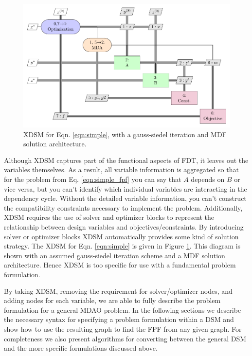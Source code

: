     \begin{figure}
        \begin{center}
        \includegraphics[height=.25\textheight]{XDSM/simple}
        \caption{XDSM for Eqn. \ref{eqn:simple}, with a gauss-siedel iteration and MDF solution architecture. \label{fig:XDSM_simple}}
        \end{center}
    \end{figure}

    Although XDSM captures part of the functional aspects of FDT, it leaves out the variables themselves. 
    As a result, all variable information is aggregated 
    so that for the problem from Eq. \ref{eqn:simple_fpf} you can say that $A$ depends on $B$ or vice versa, but you can't identify which 
    individual variables are interacting in the dependency cycle. Without the detailed variable information, you can't construct the compatibility 
    constraints necessary to implement the problem. Additionally, XDSM requires the use of solver and optimizer blocks to represent 
    the relationship between design variables and objectives/constraints. By introducing solver or optimizer blocks XDSM automatically provides
    some kind of solution strategy. The XDSM for Eqn. \ref{eqn:simple} is given in Figure \ref{fig:XDSM_simple}. 
    This diagram is shown with an assumed gauss-siedel iteration scheme and a MDF solution architecture. 
    Hence XDSM is too specific for use with a fundamental problem formulation. 

    By taking XDSM, removing the requirement for solver/optimizer nodes, and adding nodes for each variable, we are able to fully describe 
    the problem formulation for a general MDAO problem. In the following sections we describe the necessary syntax for specifying a 
    problem formulation within a DSM and show how to use the resulting graph to find the FPF from any given graph. For completeness we 
    also present algorithms for converting between the general DSM and the more specific formulations discussed above. 


